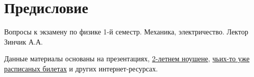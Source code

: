 \section*{Предисловие}

Вопросы к экзамену по физике 1-й семестр. Механика, электричество. Лектор
Зинчик А.А. 

Данные материалы основаны на презентациях, 
\href{https://www.notion.so/native/ea1ac09f314447ba9ff3c53c9288204c?ysclid=lr9ui9gdbb832178919&deepLinkOpenNewTab=true}{2-летнем ноушене}, 
\href{https://studfile.net/preview/17179894/}{чьих-то уже расписаных билетах}
и других интернет-ресурсах.
